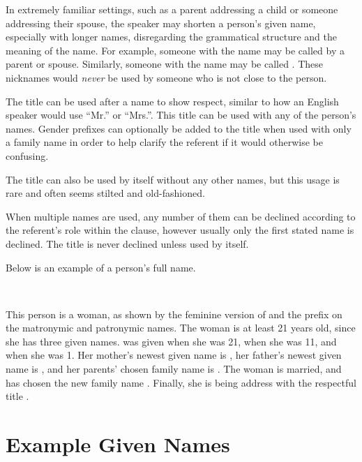 In extremely familiar settings, such as a parent addressing a child or someone addressing their spouse, the speaker may shorten a person's given name, especially with longer names, disregarding the grammatical structure and the meaning of the name. For example, someone with the name  may be called  by a parent or spouse. Similarly, someone with the name  may be called . These nicknames would \emph{never} be used by someone who is not close to the person.

The title   can be used after a name to show respect, similar to how an English speaker would use \enquote{Mr.} or \enquote{Mrs.}. This title can be used with any of the person's names. Gender prefixes can optionally be added to the title when used with only a family name in order to help clarify the referent if it would otherwise be confusing.

The title  can also be used by itself without any other names, but this usage is rare and often seems stilted and old-fashioned.

When multiple names are used, any number of them can be declined according to the referent's role within the clause, however usually only the first stated name is declined. The title  is never declined unless used by itself.

Below is an example of a person's full name.

\exdisplay\noexno
	\\
\xe

This person is a woman, as shown by the feminine version of  and the prefix  on the matronymic and patronymic names. The woman is at least 21 years old, since she has three given names.  was given when she was 21,  when she was 11, and  when she was 1. Her mother's newest given name is , her father's newest given name is , and her parents' chosen family name is . The woman is married, and has chosen the new family name . Finally, she is being address with the respectful title .

\section{Example Given Names}
\label{sec:example-names}

